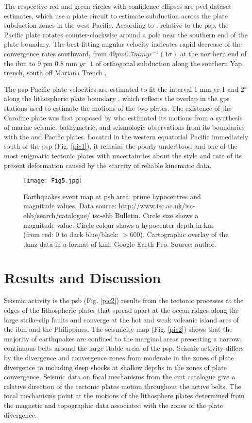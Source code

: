 \documentclass{rrparticle}
\begin{document}
The respective red and green circles with confidence ellipses are \ac{pvel} dataset estimates, which use a plate circuit to estimate subduction across the plate subduction zones in the west Pacific. According to \cite{DeMets1990}, relative to the \ac{psp}, the Pacific plate rotates counter-clockwise around a pole near the southern end of the plate boundary. The best-fitting angular velocity indicates rapid decrease of the convergence rates southward, from $49 pm 0.7 mm yr^{-1} (1\sigma)$ at the northern end of the \ac{ibm} to 9 pm 0.8 mm $yr^-1$ of orthogonal subduction along the southern Yap trench, south off Mariana Trench \cite{DeMets2010}.

The \ac{psp}-Pacific plate velocities are estimated to fit the interval 1 mm yr-1 and 2° along the lithospheric plate boundary \cite{Sella}, which reflects the overlap in the \ac{gps} stations used to estimate the motions of the two plates. The existence of the Caroline plate was first proposed by \cite{Weissel} who estimated its motions from a synthesis of marine seismic, bathymetric, and seismologic observations from its boundaries with the and Pacific plates. Located in the western equatorial Pacific immediately south of the \ac{psp} (Fig. \ref{pic1}), it remains the poorly understood and one of the most enigmatic tectonic plates with uncertainties about the style and rate of its present deformation caused by the scarcity of reliable kinematic data. 

\begin{figure}[H]
\centering
\texttt{[image: Fig5.jpg]}
\caption{Earthquakes event map at \ac{psb} area: prime hypocentres and magnitude values. Data source: http://www.isc.ac.uk/isc-ehb/search/catalogue/ \ac{isc}-\ac{ehb} Bulletin. Circle size shows a magnitude value. Circle colour shows a hypocenter depth in km (from red: 0 to dark blue/black: $>600$). Cartographic overlay of the .kmz data in a format of \ac{kml}: Google Earth Pro. Source: author.}
\label{pic5}
\end{figure}
	
\section{Results and Discussion}
	
Seismic activity is the \ac{psb} (Fig. \ref{pic2}) results from the tectonic processes at the edges of the lithospheric plates that spread apart at the ocean ridges along the large strike-slip faults and converge at the hot and weak volcanic island arcs of the \ac{ibm} and the Philippines. The seismicity map (Fig. \ref{pic2}) shows that the majority of earthquakes are confined to the marginal areas presenting a narrow, continuous belts around the large stable areas of the \ac{psp}. Seismic activity differs by the divergence and convergence zones from moderate in the zones of plate divergence to including deep shocks at shallow depths in the zones of plate convergence. Seismic data on focal mechanisms from the \ac{cmt} catalogue give a relative direction of the tectonic plates motion throughout the active belts. The focal mechanisms point at the motions of the lithosphere plates determined from the magnetic and topographic data associated with the zones of the plate divergence.
\end{document}
